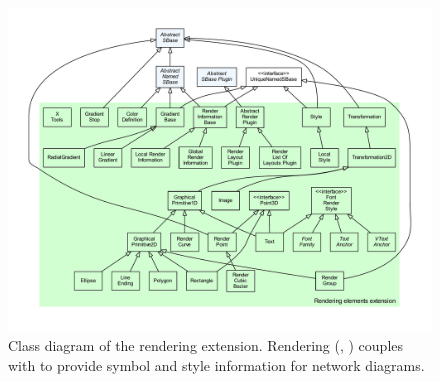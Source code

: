 \begin{figure}[hb]
 \centering
 \vspace*{2ex}
 \includegraphics[width=\textwidth]{../../../extensions/render/doc/img/type_hierarchy.pdf}
 \caption[Class diagram of the rendering extension.]{Class diagram of the rendering extension. Rendering (, \cite{gauges2006}) couples with \cite{Layout} to provide symbol and style information for network diagrams.}
 \label{fig:render}
\end{figure}


